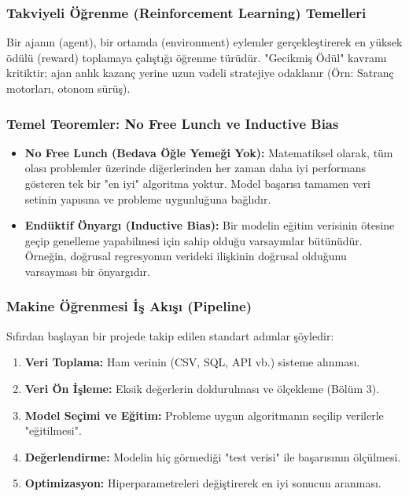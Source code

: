 \documentclass[12pt,a4paper]{article}
\begin{document}
\subsubsection{Takviyeli Öğrenme (Reinforcement Learning) Temelleri}
Bir ajanın (agent), bir ortamda (environment) eylemler gerçekleştirerek en yüksek ödülü (reward) toplamaya çalıştığı öğrenme türüdür. "Gecikmiş Ödül" kavramı kritiktir; ajan anlık kazanç yerine uzun vadeli stratejiye odaklanır (Örn: Satranç motorları, otonom sürüş).

\subsubsection{Temel Teoremler: No Free Lunch ve Inductive Bias}
\begin{itemize}
    \item \textbf{No Free Lunch (Bedava Öğle Yemeği Yok):} Matematiksel olarak, tüm olası problemler üzerinde diğerlerinden her zaman daha iyi performans gösteren tek bir "en iyi" algoritma yoktur. Model başarısı tamamen veri setinin yapısına ve probleme uygunluğuna bağlıdır.
    \item \textbf{Endüktif Önyargı (Inductive Bias):} Bir modelin eğitim verisinin ötesine geçip genelleme yapabilmesi için sahip olduğu varsayımlar bütünüdür. Örneğin, doğrusal regresyonun verideki ilişkinin doğrusal olduğunu varsayması bir önyargıdır.
\end{itemize}

\subsubsection{Makine Öğrenmesi İş Akışı (Pipeline)}
Sıfırdan başlayan bir projede takip edilen standart adımlar şöyledir:
\begin{enumerate}
    \item \textbf{Veri Toplama:} Ham verinin (CSV, SQL, API vb.) sisteme alınması.
    \item \textbf{Veri Ön İşleme:} Eksik değerlerin doldurulması ve ölçekleme (Bölüm 3).
    \item \textbf{Model Seçimi ve Eğitim:} Probleme uygun algoritmanın seçilip verilerle "eğitilmesi".
    \item \textbf{Değerlendirme:} Modelin hiç görmediği "test verisi" ile başarısının ölçülmesi.
    \item \textbf{Optimizasyon:} Hiperparametreleri değiştirerek en iyi sonucun aranması.
\end{enumerate}
\end{document}
